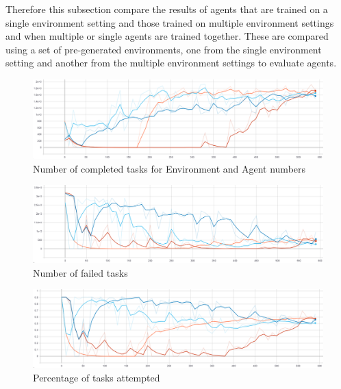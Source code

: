 Therefore this subsection compare the results of agents that are trained on a single environment setting and those
trained on multiple environment settings and when multiple or single agents are trained together. These are compared
using a set of pre-generated environments, one from the single environment setting and another from the multiple
environment settings to evaluate agents.

\begin{figure}[H]
    \centering
    \includegraphics[width=\linewidth]{figures/5_evaluation_figs/env_training_fig/num_completed_tasks.png}
    \caption{Number of completed tasks for Environment and Agent numbers}
    \label{fig:env_num_completed_tasks}
\end{figure}

\begin{figure}[H]
    \centering
    \includegraphics[width=\linewidth]{figures/5_evaluation_figs/env_training_fig/num_failed_tasks.png}
    \caption{Number of failed tasks}
    \label{fig:env_num_failed_tasks}
\end{figure}

\begin{figure}[H]
    \centering
    \includegraphics[width=\linewidth]{figures/5_evaluation_figs/env_training_fig/percent_tasks.png}
    \caption{Percentage of tasks attempted}
    \label{fig:env_percent_tasks}
\end{figure}

